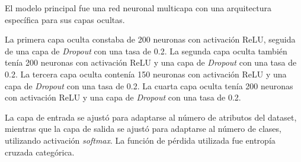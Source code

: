 \documentclass[conference]{IEEEtran}
\begin{document}
El modelo principal fue una red neuronal multicapa con una arquitectura específica para sus capas ocultas.

La primera capa oculta constaba de 200 neuronas con activación ReLU, seguida de una capa de \textit{Dropout} con una tasa de 0.2. La segunda capa oculta también tenía 200 neuronas con activación ReLU y una capa de \textit{Dropout} con una tasa de 0.2. La tercera capa oculta contenía 150 neuronas con activación ReLU y una capa de \textit{Dropout} con una tasa de 0.2. La cuarta capa oculta tenía 200 neuronas con activación ReLU y una capa de \textit{Dropout} con una tasa de 0.2.

La capa de entrada se ajustó para adaptarse al número de atributos del dataset, mientras que la capa de salida se ajustó para adaptarse al número de clases, utilizando activación \textit{softmax}. La función de pérdida utilizada fue entropía cruzada categórica.
\end{document}
